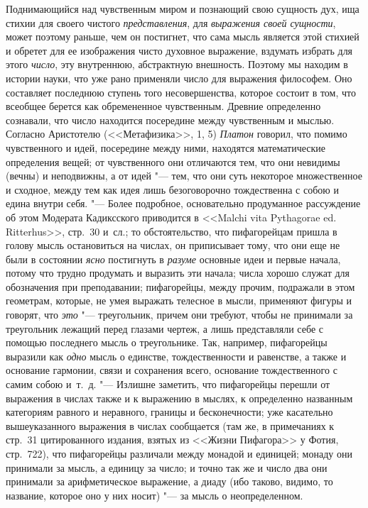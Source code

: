 Поднимающийся над чувственным миром и познающий свою сущность дух, ища
стихии для своего чистого {\em представления}, для
{\em выражения своей сущности}, может поэтому раньше,
чем он постигнет, что сама мысль является этой стихией и обретет для ее
изображения чисто духовное выражение, вздумать избрать для этого
{\em число}, эту внутреннюю, абстрактную внешность.
Поэтому мы находим в истории науки, что уже рано применяли число для
выражения философем. Оно составляет последнюю ступень того несовершенства,
которое состоит в том, что всеобщее берется как обремененное чувственным.
Древние определенно сознавали, что число находится посередине между
чувственным и мыслью. Согласно Аристотелю (<<Метафизика>>, 1, 5)
{\em Платон} говорил, что помимо чувственного и идей,
посередине между ними, находятся математические определения вещей; от
чувственного они отличаются тем, что они невидимы (вечны) и неподвижны, а
от идей "--- тем, что они суть некоторое множественное и сходное, между тем
как идея лишь безоговорочно тождественна с собою и едина внутри себя. "---
Более подробное, основательно продуманное рассуждение об этом Модерата
Кадиксского приводится в <<Malchi vita Pythagorae ed. Ritterhus>>, стр.~30
и~сл.; то обстоятельство, что пифагорейцам пришла в голову мысль остановиться
на числах, он приписывает тому, что они еще не были в состоянии
{\em ясно} постигнуть в
{\em разуме} основные идеи и первые начала, потому что
трудно продумать и выразить эти начала; числа хорошо служат для обозначения
при преподавании; пифагорейцы, между прочим, подражали в этом геометрам,
которые, не умея выражать телесное в мысли, применяют фигуры и говорят, что
{\em это} "--- треугольник, причем они требуют, чтобы не
принимали за треугольник лежащий перед глазами чертеж, а лишь представляли
себе с помощью последнего мысль о треугольнике. Так, например, пифагорейцы
выразили как {\em одно} мысль о единстве,
тождественности и равенстве, а также и основание гармонии, связи и
сохранения всего, основание тождественного с самим собою и~т.~д. "--- Излишне
заметить, что пифагорейцы перешли от выражения в числах также и к выражению
в мыслях, к определенно названным категориям равного и неравного, границы и
бесконечности; уже касательно вышеуказанного выражения в числах сообщается
(там же, в примечаниях к стр.~31 цитированного издания, взятых из <<Жизни
Пифагора>> у Фотия, стр.~722), что пифагорейцы различали между монадой и
единицей; монаду они принимали за мысль, а единицу за число; и точно так же
и число два они принимали за арифметическое выражение, а диаду (ибо таково,
видимо, то название, которое оно у них носит) "--- за мысль о неопределенном.
